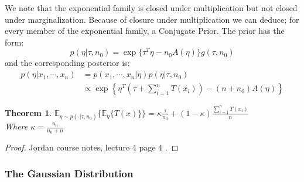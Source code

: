 \documentclass[]{article}
\theoremstyle{mattstyle}
\newtheorem{theorem}{Theorem}[section]
\theoremstyle{definition}
\begin{document}
We note that the exponential family is closed under multiplication but not closed under marginalization. Because of closure under multiplication we can deduce; for every member of the exponential family, a Conjugate Prior. The prior has the form:
$$ p(\eta | \tau, n_0) = \exp\{ \tau^T\eta - n_0A(\eta)\}g(\tau,n_0)$$  
and the corresponding posterior is:
\begin{align*}
p( \eta | x_1, \cdots, x_n) &= p(x_1, \cdots, x_n | \eta)p(\eta| \tau, n_0)\\
&\propto\exp\left\{\eta^T\left(\tau + \sum_{i=1}^nT(x_i)\right) - (n + n_0)A(\eta)\right\}
\end{align*}
\begin{theorem}
	$\mathbb{E}_{\eta \sim p(\cdot| \tau, n_0)}\{\mathbb{E}_{\eta}\{ T(x)\}\} = \kappa \frac{\tau}{n_0} + (1-\kappa)\frac{\sum_{i=1}^nT(x_i)}{n}$\\
	Where $\kappa = \frac{n_0}{n_0 + n}$
\end{theorem}
\begin{proof}
	Jordan course notes, lecture 4 page 4 \cite{MJordanNotes}.
\end{proof}

\subsubsection{The Gaussian Distribution}
\end{document}
